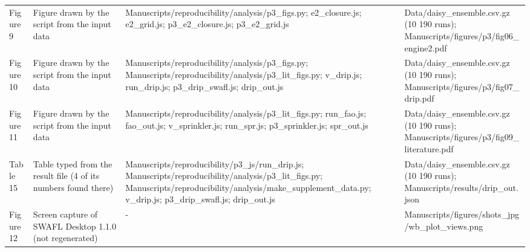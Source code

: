 {\begin{longtable}{p{}p{}p{}p{}}
{}Figure 9 & Figure drawn by the script from the input data & Manuscripts/\allowbreak{}reproducibility/\allowbreak{}analysis/\allowbreak{}p3\_\allowbreak{}figs.py;  e2\_\allowbreak{}closure.js;  e2\_\allowbreak{}grid.js;  p3\_\allowbreak{}e2\_\allowbreak{}closure.js;  p3\_\allowbreak{}e2\_\allowbreak{}grid.js & Data/\allowbreak{}daisy\_\allowbreak{}ensemble.csv.gz (10 190 runs);  Manuscripts/\allowbreak{}figures/\allowbreak{}p3/\allowbreak{}fig06\_\allowbreak{}engine2.pdf\\
{}Figure 10 & Figure drawn by the script from the input data & Manuscripts/\allowbreak{}reproducibility/\allowbreak{}analysis/\allowbreak{}p3\_\allowbreak{}figs.py;  Manuscripts/\allowbreak{}reproducibility/\allowbreak{}analysis/\allowbreak{}p3\_\allowbreak{}lit\_\allowbreak{}figs.py;  v\_\allowbreak{}drip.js;  run\_\allowbreak{}drip.js;  p3\_\allowbreak{}drip\_\allowbreak{}swafl.js;  drip\_\allowbreak{}out.js & Data/\allowbreak{}daisy\_\allowbreak{}ensemble.csv.gz (10 190 runs);  Manuscripts/\allowbreak{}figures/\allowbreak{}p3/\allowbreak{}fig07\_\allowbreak{}drip.pdf\\
{}Figure 11 & Figure drawn by the script from the input data & Manuscripts/\allowbreak{}reproducibility/\allowbreak{}analysis/\allowbreak{}p3\_\allowbreak{}lit\_\allowbreak{}figs.py;  run\_\allowbreak{}fao.js;  fao\_\allowbreak{}out.js;  v\_\allowbreak{}sprinkler.js;  run\_\allowbreak{}spr.js;  p3\_\allowbreak{}sprinkler.js;  spr\_\allowbreak{}out.js & Data/\allowbreak{}daisy\_\allowbreak{}ensemble.csv.gz (10 190 runs);  Manuscripts/\allowbreak{}figures/\allowbreak{}p3/\allowbreak{}fig09\_\allowbreak{}literature.pdf\\
{}Table 15 & Table typed from the result file (4 of its numbers found there) & Manuscripts/\allowbreak{}reproducibility/\allowbreak{}p3\_\allowbreak{}js/\allowbreak{}run\_\allowbreak{}drip.js;  Manuscripts/\allowbreak{}reproducibility/\allowbreak{}analysis/\allowbreak{}p3\_\allowbreak{}lit\_\allowbreak{}figs.py;  Manuscripts/\allowbreak{}reproducibility/\allowbreak{}analysis/\allowbreak{}make\_\allowbreak{}supplement\_\allowbreak{}data.py;  v\_\allowbreak{}drip.js;  p3\_\allowbreak{}drip\_\allowbreak{}swafl.js;  drip\_\allowbreak{}out.js & Data/\allowbreak{}daisy\_\allowbreak{}ensemble.csv.gz (10 190 runs);  Manuscripts/\allowbreak{}results/\allowbreak{}drip\_\allowbreak{}out.json\\
{}Figure 12 & Screen capture of SWAFL Desktop 1.1.0 (not regenerated) & - & Manuscripts/\allowbreak{}figures/\allowbreak{}shots\_\allowbreak{}jpg/\allowbreak{}wb\_\allowbreak{}plot\_\allowbreak{}views.png\\

\end{longtable}}
